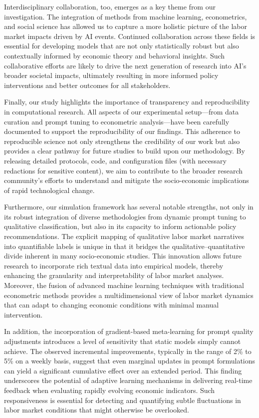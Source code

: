 \documentclass{article} %
\begin{document}
Interdisciplinary collaboration, too, emerges as a key theme from our investigation. The integration of methods from machine learning, econometrics, and social science has allowed us to capture a more holistic picture of the labor market impacts driven by AI events. Continued collaboration across these fields is essential for developing models that are not only statistically robust but also contextually informed by economic theory and behavioral insights. Such collaborative efforts are likely to drive the next generation of research into AI’s broader societal impacts, ultimately resulting in more informed policy interventions and better outcomes for all stakeholders.

Finally, our study highlights the importance of transparency and reproducibility in computational research. All aspects of our experimental setup—from data curation and prompt tuning to econometric analysis—have been carefully documented to support the reproducibility of our findings. This adherence to reproducible science not only strengthens the credibility of our work but also provides a clear pathway for future studies to build upon our methodology. By releasing detailed protocols, code, and configuration files (with necessary redactions for sensitive content), we aim to contribute to the broader research community’s efforts to understand and mitigate the socio-economic implications of rapid technological change.

Furthermore, our simulation framework has several notable strengths, not only in its robust integration of diverse methodologies from dynamic prompt tuning to qualitative classification, but also in its capacity to inform actionable policy recommendations. The explicit mapping of qualitative labor market narratives into quantifiable labels is unique in that it bridges the qualitative–quantitative divide inherent in many socio-economic studies. This innovation allows future research to incorporate rich textual data into empirical models, thereby enhancing the granularity and interpretability of labor market analyses. Moreover, the fusion of advanced machine learning techniques with traditional econometric methods provides a multidimensional view of labor market dynamics that can adapt to changing economic conditions with minimal manual intervention.

In addition, the incorporation of gradient-based meta-learning for prompt quality adjustments introduces a level of sensitivity that static models simply cannot achieve. The observed incremental improvements, typically in the range of 2\% to 5\% on a weekly basis, suggest that even marginal updates in prompt formulations can yield a significant cumulative effect over an extended period. This finding underscores the potential of adaptive learning mechanisms in delivering real-time feedback when evaluating rapidly evolving economic indicators. Such responsiveness is essential for detecting and quantifying subtle fluctuations in labor market conditions that might otherwise be overlooked.
\end{document}
